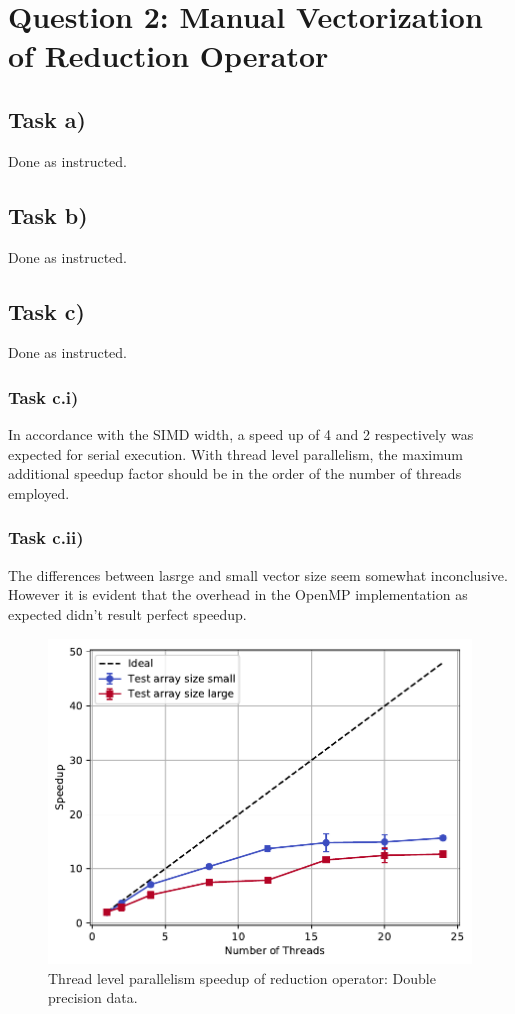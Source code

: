 \documentclass[11pt,a4paper]{article}
\begin{document}
\section{Question 2: Manual Vectorization of Reduction Operator}


\subsection{Task a)}
Done as instructed.

\subsection{Task b)}
Done as instructed.

\subsection{Task c)}
Done as instructed.

\subsubsection{Task c.i)}
In accordance with the SIMD width, a speed up of 4 and 2 respectively was expected for serial execution.
With thread level parallelism, the maximum additional speedup factor should be in the order of the number of threads employed.

\subsubsection{Task c.ii)}
The differences between lasrge and small vector size seem somewhat inconclusive. However it is evident that the overhead
in the OpenMP implementation as expected didn't result perfect speedup.


\begin{figure}[ht]
\begin{center}
\includegraphics[scale=0.5]{2-way.pdf} 
\end{center}
\caption{Thread level parallelism speedup of reduction operator: Double precision data.}
\label{fig1}
\end{figure}
\end{document}
